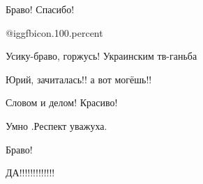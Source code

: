 \begin{itemize}
Браво! Спасибо!

 @igg{fbicon.100.percent} 

Усику-браво, горжусь! Украинским тв-ганьба

Юрий, зачиталась!! а вот могёшь!!

Словом и делом! Красиво!

Умно .Респект уважуха.

Браво!

ДА!!!!!!!!!!!!!


\end{itemize} %
